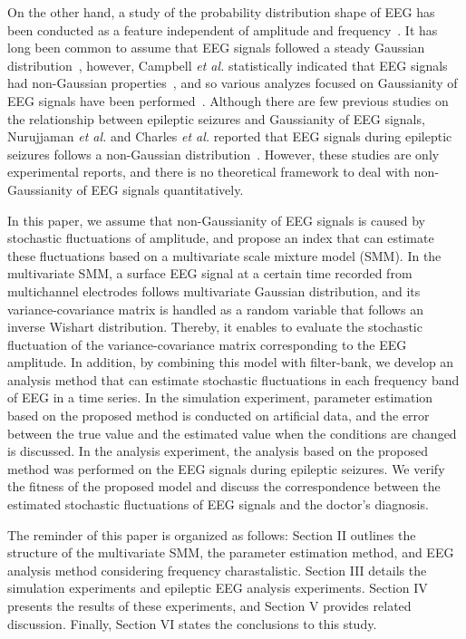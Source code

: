 \documentclass[journal]{IEEEtran}
\begin{document}
On the other hand, a study of the probability distribution shape of EEG has been conducted as a feature independent of amplitude and frequency~\cite{Sounders1963,Gonen2012,Campbell1967,Weiss1973,Nurujjaman2009,Charles1999}.
It has long been common to assume that EEG signals followed a steady Gaussian distribution~\cite{Sounders1963,Gonen2012}, however, Campbell \textit{et al.} statistically indicated that EEG signals had non-Gaussian properties~\cite{Campbell1967}, and so various analyzes focused on Gaussianity of EEG signals have been performed~\cite{Gonen2012,Weiss1973,Nurujjaman2009,Charles1999}.
Although there are few previous studies on the relationship between epileptic seizures and Gaussianity of EEG signals, Nurujjaman \textit{et al.} and Charles \textit{et al.} reported that EEG signals during epileptic seizures follows a non-Gaussian distribution~\cite{Nurujjaman2009,Charles1999}.
However, these studies are only experimental reports, and there is no theoretical framework to deal with non-Gaussianity of EEG signals quantitatively.

In this paper, we assume that non-Gaussianity of EEG signals is caused by stochastic fluctuations of amplitude, and propose an index that can estimate these fluctuations based on a multivariate scale mixture model (SMM).
In the multivariate SMM, a surface EEG signal at a certain time recorded from multichannel electrodes follows multivariate Gaussian distribution, and its variance-covariance matrix is handled as a random variable that follows an inverse Wishart distribution.
Thereby, it enables to evaluate the stochastic fluctuation of the variance-covariance matrix corresponding to the EEG amplitude.
In addition, by combining this model with filter-bank, we develop an analysis method that can estimate stochastic fluctuations in each frequency band of EEG in a time series.
In the simulation experiment, parameter estimation based on the proposed method is conducted on artificial data, and the error between the true value and the estimated value when the conditions are changed is discussed.
In the analysis experiment, the analysis based on the proposed method was performed on the EEG signals during epileptic seizures.
We verify the fitness of the proposed model and discuss the correspondence between the estimated stochastic fluctuations of EEG signals and the doctor's diagnosis.

The reminder of this paper is organized as follows: Section II outlines the structure of the multivariate SMM, the parameter estimation method, and EEG analysis method considering frequency charastalistic. Section III details the simulation experiments and  epileptic EEG analysis experiments. Section IV presents the results of these experiments, and Section V provides related discussion. Finally, Section VI states the conclusions to this study.
\end{document}
